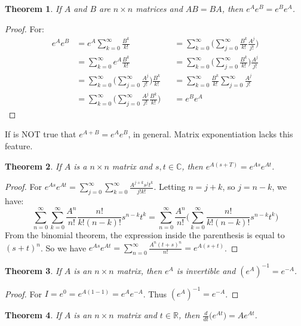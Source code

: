 \documentclass{article}
\theoremstyle{mystyle}
\newtheorem{theorem}{Theorem}[section]
\begin{document}
\begin{theorem}
If $A$ and $B$ are $n\times n$ matrices and $AB = BA$, then $e^{A}e^{B} = e^{B}e^{A}$.
\end{theorem}
\begin{proof}
For:
\begin{align*}
    e^A e^B &= e^A\sum_{k=0}^{\infty} \frac{B^k}{k!} & &=\sum_{k=0}^{\infty}\big(\sum_{j=0}^{\infty} \frac{B^k}{k!}\frac{A^j}{j!}\big) \\
    &= \sum_{k=0}^{\infty} e^A\frac{B^k}{k!} & &=\sum_{k=0}^{\infty}\big(\sum_{j=0}^{\infty} \frac{B^k}{k!}\big)\frac{A^j}{j!} \\
    &= \sum_{k=0}^{\infty} \big(\sum_{j=0}^{\infty} \frac{A^j}{j!}\big) \frac{B^k}{k!} & &= \sum_{k=0}^{\infty} \frac{B^k}{k!} \sum_{j=0}^{\infty} \frac{A^j}{j!} \\
    &= \sum_{k=0}^{\infty}\big(\sum_{j=0}^{\infty} \frac{A^j}{j!}\frac{B^k}{k!}\big) & &= e^Be^A
\end{align*}
\end{proof}
If is NOT true that $e^{A+B} = e^Ae^B$, in general. Matrix exponentiation lacks this feature.
\begin{theorem}
If $A$ is a $n\times n$ matrix and $s,t\in \mathbb{C}$, then $e^{A(s+T)} = e^{As}e^{At}$.
\end{theorem}
\begin{proof}
For $e^{As}e^{At} = \sum_{j=0}^{\infty} \sum_{k=0}^{\infty} \frac{A^{j+k}s^jt^k}{j!k!}$. Letting $n = j+k$, so $j = n-k$, we have:
\begin{equation*}
    \sum_{n=0}^{\infty} \sum_{k=0}^{\infty} \frac{A^n}{n!}\frac{n!}{k!(n-k)!}s^{n-k}t^k = \sum_{n=0}^{\infty}\frac{A^n}{n!}\big(\sum_{k=0}^{\infty} \frac{n!}{k!(n-k)!}s^{n-k}t^k\big)    
\end{equation*}
From the binomial theorem, the expression inside the parenthesis is equal to $(s+t)^n$. So we have $e^{As}e^{At}=\sum_{n=0}^{\infty} \frac{A^n(t+s)^n}{n!} = e^{A(s+t)}$.
\end{proof}
\begin{theorem}
If $A$ is an $n\times n$ matrix, then $e^A$ is invertible and $(e^A)^{-1} = e^{-A}$.
\end{theorem}
\begin{proof}
For $I = e^{0} = e^{A(1-1)} = e^Ae^{-A}$. Thus $(e^{A})^{-1} = e^{-A}$.
\end{proof}
\begin{theorem}
If $A$ is an $n\times n$ matrix and $t\in \mathbb{R}$, then $\frac{d}{dt}\big(e^{At}\big) = Ae^{At}$.
\end{theorem}
\end{document}
